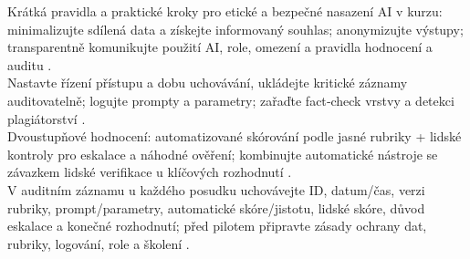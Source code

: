 Krátká pravidla a praktické kroky pro etické a bezpečné nasazení AI v kurzu: minimalizujte sdílená data a získejte informovaný souhlas; anonymizujte výstupy; transparentně komunikujte použití AI, role, omezení a pravidla hodnocení a auditu \cite{4}.\\
Nastavte řízení přístupu a dobu uchovávání, ukládejte kritické záznamy auditovatelně; logujte prompty a parametry; zařaďte fact‑check vrstvy a detekci plagiátorství \cite{4,3-3}.\\
Dvoustupňové hodnocení: automatizované skórování podle jasné rubriky + lidské kontroly pro eskalace a náhodné ověření; kombinujte automatické nástroje se závazkem lidské verifikace u klíčových rozhodnutí \cite{3-3,4}.\\
V auditním záznamu u každého posudku uchovávejte ID, datum/čas, verzi rubriky, prompt/parametry, automatické skóre/jistotu, lidské skóre, důvod eskalace a konečné rozhodnutí; před pilotem připravte zásady ochrany dat, rubriky, logování, role a školení \cite{3-3,4}.